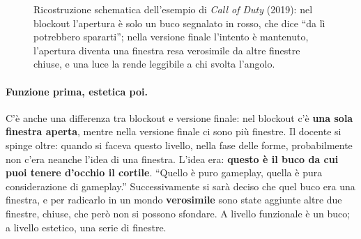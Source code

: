 \begin{figure}[htbp]
\centering
{}
\caption{Ricostruzione schematica dell'esempio di \emph{Call of Duty}
(2019): nel blockout l'apertura è solo un buco segnalato in rosso, che dice
``da lì potrebbero spararti''; nella versione finale l'intento è mantenuto,
l'apertura diventa una finestra resa verosimile da altre finestre chiuse, e una
luce la rende leggibile a chi svolta l'angolo.}
\label{gd11:fig:cod}
\end{figure}

\paragraph{Funzione prima, estetica poi.} C'è anche una differenza tra
blockout e versione finale: nel blockout c'è \textbf{una sola finestra aperta},
mentre nella versione finale ci sono più finestre. Il docente si spinge oltre:
quando si faceva questo livello, nella fase delle forme, probabilmente non
c'era neanche l'idea di una finestra. L'idea era: \textbf{questo è il buco da
cui puoi tenere d'occhio il cortile}. ``Quello è puro gameplay, quella è pura
considerazione di gameplay.'' Successivamente si sarà deciso che quel buco era
una finestra, e per radicarlo in un mondo \textbf{verosimile} sono state
aggiunte altre due finestre, chiuse, che però non si possono sfondare. A
livello funzionale è un buco; a livello estetico, una serie di finestre.

